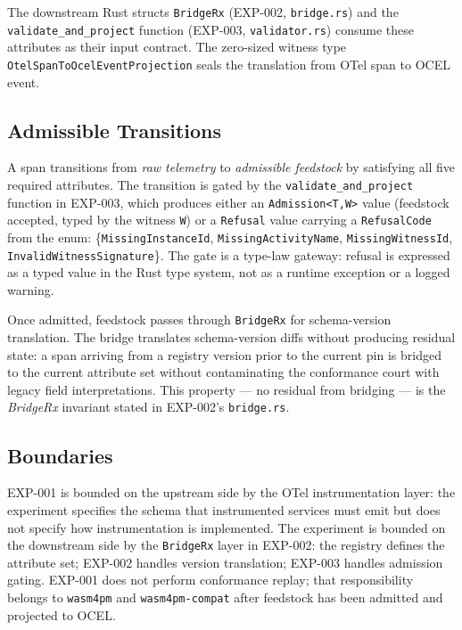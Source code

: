 The downstream Rust structs \texttt{BridgeRx} (EXP-002, \texttt{bridge.rs}) and the
\texttt{validate\_and\_project} function (EXP-003, \texttt{validator.rs}) consume these attributes
as their input contract. The zero-sized witness type
\texttt{OtelSpanToOcelEventProjection} seals the translation from OTel span to OCEL event.

\subsection{Admissible Transitions}
\label{sec:otel-weaver-exp-001-custom-pi-registry-architecture-transitions}

A span transitions from \emph{raw telemetry} to \emph{admissible feedstock} by satisfying all
five required attributes. The transition is gated by the \texttt{validate\_and\_project} function
in EXP-003, which produces either an \texttt{Admission<T,W>} value (feedstock accepted, typed by
the witness \texttt{W}) or a \texttt{Refusal} value carrying a \texttt{RefusalCode} from the
enum: \{\texttt{MissingInstanceId}, \texttt{MissingActivityName}, \texttt{MissingWitnessId},
\texttt{InvalidWitnessSignature}\}. The gate is a type-law gateway: refusal is expressed as a
typed value in the Rust type system, not as a runtime exception or a logged warning.

Once admitted, feedstock passes through \texttt{BridgeRx} for schema-version translation. The
bridge translates schema-version diffs without producing residual state: a span arriving from a
registry version prior to the current pin is bridged to the current attribute set without
contaminating the conformance court with legacy field interpretations. This property --- no
residual from bridging --- is the \emph{BridgeRx} invariant stated in EXP-002's \texttt{bridge.rs}.

\subsection{Boundaries}
\label{sec:otel-weaver-exp-001-custom-pi-registry-architecture-boundaries}

EXP-001 is bounded on the upstream side by the OTel instrumentation layer: the experiment
specifies the schema that instrumented services must emit but does not specify how instrumentation
is implemented. The experiment is bounded on the downstream side by the \texttt{BridgeRx}
layer in EXP-002: the registry defines the attribute set; EXP-002 handles version translation;
EXP-003 handles admission gating. EXP-001 does not perform conformance replay; that responsibility
belongs to \texttt{wasm4pm} and \texttt{wasm4pm-compat} after feedstock has been admitted and
projected to OCEL.

